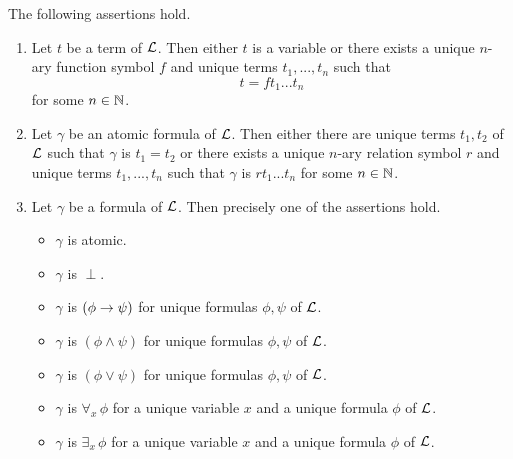 \documentclass[10pt]{amsart}
\begin{document}
\begin{theorem}\label{theorem:unique_readability_of_terms_and_formulas}
	The following assertions hold.
	\begin{enumerate}[label=\emph{\textbf{(\arabic*)}}, leftmargin=3.0em]
		\item Let $t$ be a term of ${\mathcal L}$. Then either $t$ is a variable or there exists a unique $n$-ary function symbol $f$ and unique terms $t_1,...,t_n$ such that
		      $$t = ft_1...t_n$$
		      for some $n \in {\mathbb N}$.
		\item Let $\gamma$ be an atomic formula of ${\mathcal L}$. Then either there are unique terms $t_1,t_2$ of ${\mathcal L}$ such that $\gamma$ is $t_1 = t_2$ or there exists a unique $n$-ary relation symbol $r$ and unique terms $t_1,...,t_n$ such that $\gamma$ is $rt_1...t_n$ for some $n\in {\mathbb N}$.
		\item Let $\gamma$ be a formula of ${\mathcal L}$. Then precisely one of the assertions hold.
		      \begin{itemize}
			      \item $\gamma$ is atomic.
			      \item $\gamma$ is $\perp$.
			      \item $\gamma$ is $(\phi \rightarrow \psi)$ for unique formulas $\phi, \psi$ of ${\mathcal L}$.
			      \item $\gamma$ is $(\phi \wedge \psi)$ for unique formulas $\phi,\psi$ of ${\mathcal L}$.
			      \item $\gamma$ is $(\phi \vee \psi)$ for unique formulas $\phi,\psi$ of ${\mathcal L}$.
			      \item $\gamma$ is $\forall_x\,\phi$ for a unique variable $x$ and a unique formula $\phi$ of ${\mathcal L}$.
			      \item $\gamma$ is $\exists_x\,\phi$ for a unique variable $x$ and a unique formula $\phi$ of ${\mathcal L}$.
		      \end{itemize}
	\end{enumerate}
\end{theorem}
\end{document}

